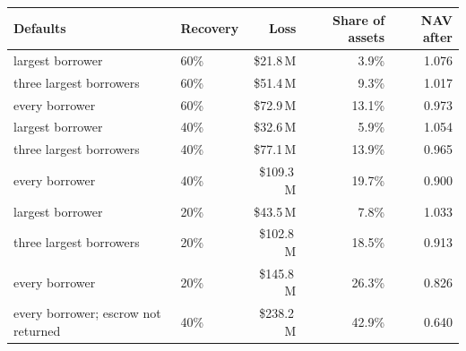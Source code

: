 \begin{tabular}{@{}llrrr@{}}
\toprule
Defaults & Recovery & Loss & Share of assets & NAV after \\
\midrule
largest borrower & 60\% & \$21.8\,M & 3.9\% & 1.076 \\
three largest borrowers & 60\% & \$51.4\,M & 9.3\% & 1.017 \\
every borrower & 60\% & \$72.9\,M & 13.1\% & 0.973 \\
largest borrower & 40\% & \$32.6\,M & 5.9\% & 1.054 \\
three largest borrowers & 40\% & \$77.1\,M & 13.9\% & 0.965 \\
every borrower & 40\% & \$109.3\,M & 19.7\% & 0.900 \\
largest borrower & 20\% & \$43.5\,M & 7.8\% & 1.033 \\
three largest borrowers & 20\% & \$102.8\,M & 18.5\% & 0.913 \\
every borrower & 20\% & \$145.8\,M & 26.3\% & 0.826 \\
every borrower; escrow not returned & 40\% & \$238.2\,M & 42.9\% & 0.640 \\
\bottomrule
\end{tabular}
